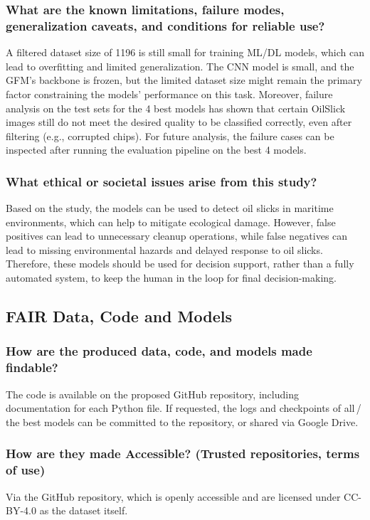 \documentclass[sigconf]{acmart}
\begin{document}
\subsubsection{What are the known limitations, failure modes, generalization caveats, and conditions for reliable use?} \label{sec:limit} 
A filtered dataset size of 1196 is still small for training ML/DL models, which can lead to overfitting and limited generalization. The CNN model is small, and the GFM's backbone is frozen, but the limited dataset size might remain the primary factor constraining the models' performance on this task. Moreover, failure analysis on the test sets for the 4 best models has shown that certain OilSlick images still do not meet the desired quality to be classified correctly, even after filtering (e.g., corrupted chips). For future analysis, the failure cases can be inspected after running the evaluation pipeline on the best 4 models.

\subsubsection{What ethical or societal issues arise from this study?} Based on the study, the models can be used to detect oil slicks in maritime environments, which can help to mitigate ecological damage. However, false positives can lead to unnecessary cleanup operations, while false negatives can lead to missing environmental hazards and delayed response to oil slicks. Therefore, these models should be used for decision support, rather than a fully automated system, to keep the human in the loop for final decision-making.

\subsection{FAIR Data, Code and Models}
\subsubsection{How are the produced data, code, and models made findable?} The code is available on the proposed GitHub repository, including documentation for each Python file. If requested, the logs and checkpoints of all\,/\,the best models can be committed to the repository, or shared via Google Drive.
\subsubsection{How are they made Accessible? (Trusted repositories, terms of use)} Via the GitHub repository, which is openly accessible and are licensed under CC-BY-4.0 as the dataset itself.
\end{document}
